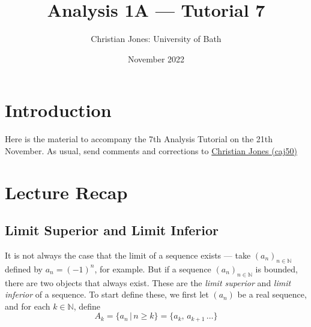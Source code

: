 \documentclass[
  10pt,
  a4paper]{article}
\title{Analysis 1A --- Tutorial 7}
\author{Christian Jones: University of Bath}
\date{November 2022}
\theoremstyle{plain}
\theoremstyle{plain}
\theoremstyle{plain}
\theoremstyle{plain}
\theoremstyle{plain}
\theoremstyle{definition}
\theoremstyle{definition}
\theoremstyle{definition}
\theoremstyle{remark}
\begin{document}
\maketitle

{
\setcounter{tocdepth}{2}
\tableofcontents
}
\newpage
{}

\hypertarget{introduction}{%
\section*{Introduction}\label{introduction}}

Here is the material to accompany the 7th Analysis Tutorial on the 21th November. As usual, send comments and corrections to \href{mailto:caj50@bath.ac.uk}{Christian Jones (caj50)}

\hypertarget{lecture-recap}{%
\section{Lecture Recap}\label{lecture-recap}}

\hypertarget{limit-superior-and-limit-inferior}{%
\subsection{Limit Superior and Limit Inferior}\label{limit-superior-and-limit-inferior}}

It is not always the case that the limit of a sequence exists --- take \((a_n)_{n\in\mathbb{N}}\) defined by \(a_n = (-1)^n\), for example. But if a sequence \((a_n)_{n\in\mathbb{N}}\) is bounded, there are two objects that always exist. These are the \emph{limit superior} and \emph{limit inferior} of a sequence. To start define these, we first let \((a_n)\) be a real sequence, and for each \(k \in \mathbb{N}\), define \[A_k = \lbrace a_n \,\lvert\, n \geq k\rbrace = \lbrace a_k,\,a_{k+1}\,\ldots\rbrace\]
\end{document}
